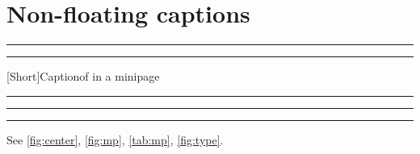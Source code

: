 \documentclass{article}
\begin{document}
\listoffigures
\listoftables
\section{Non-floating captions}
\begin{center}
\rule{3cm}{1cm}
\label{fig:center}
\end{center}
\noindent\begin{minipage}{.45\linewidth}
\centering\rule{2cm}{1cm}
[Short]{Captionof in a minipage}\label{fig:mp}
\end{minipage}\hfill
\begin{minipage}{.45\linewidth}
\label{tab:mp}
\centering\rule{2cm}{1cm}
\end{minipage}
\begin{center}
\captionsetup{type=figure}
\rule{3cm}{1cm}
\caption{Caption after captionsetup type}\label{fig:type}
\end{center}
\begin{center}
\rule{3cm}{1cm}
\end{center}
See \ref{fig:center}, \ref{fig:mp}, \ref{tab:mp}, \ref{fig:type}.
\end{document}
